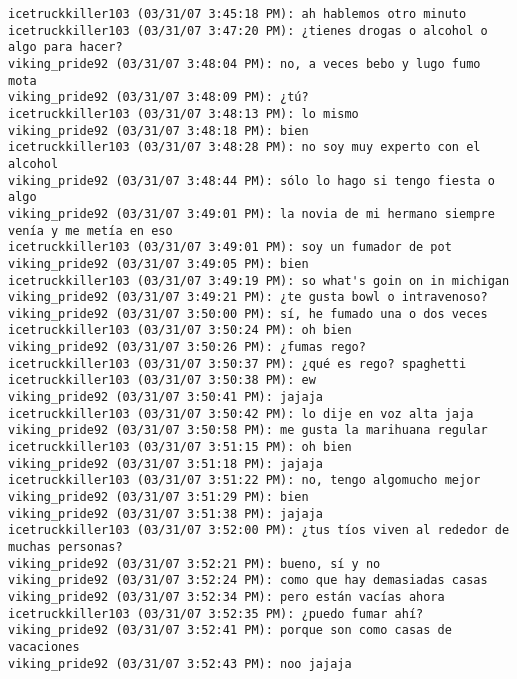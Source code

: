 \begin{verbatim}
icetruckkiller103 (03/31/07 3:45:18 PM): ah hablemos otro minuto
icetruckkiller103 (03/31/07 3:47:20 PM): ¿tienes drogas o alcohol o algo para hacer?
viking_pride92 (03/31/07 3:48:04 PM): no, a veces bebo y lugo fumo mota
viking_pride92 (03/31/07 3:48:09 PM): ¿tú?
icetruckkiller103 (03/31/07 3:48:13 PM): lo mismo
viking_pride92 (03/31/07 3:48:18 PM): bien
icetruckkiller103 (03/31/07 3:48:28 PM): no soy muy experto con el alcohol
viking_pride92 (03/31/07 3:48:44 PM): sólo lo hago si tengo fiesta o algo
viking_pride92 (03/31/07 3:49:01 PM): la novia de mi hermano siempre venía y me metía en eso
icetruckkiller103 (03/31/07 3:49:01 PM): soy un fumador de pot
viking_pride92 (03/31/07 3:49:05 PM): bien
icetruckkiller103 (03/31/07 3:49:19 PM): so what's goin on in michigan
viking_pride92 (03/31/07 3:49:21 PM): ¿te gusta bowl o intravenoso?
viking_pride92 (03/31/07 3:50:00 PM): sí, he fumado una o dos veces
icetruckkiller103 (03/31/07 3:50:24 PM): oh bien
viking_pride92 (03/31/07 3:50:26 PM): ¿fumas rego?
icetruckkiller103 (03/31/07 3:50:37 PM): ¿qué es rego? spaghetti
icetruckkiller103 (03/31/07 3:50:38 PM): ew
viking_pride92 (03/31/07 3:50:41 PM): jajaja
icetruckkiller103 (03/31/07 3:50:42 PM): lo dije en voz alta jaja
viking_pride92 (03/31/07 3:50:58 PM): me gusta la marihuana regular
icetruckkiller103 (03/31/07 3:51:15 PM): oh bien
viking_pride92 (03/31/07 3:51:18 PM): jajaja
icetruckkiller103 (03/31/07 3:51:22 PM): no, tengo algomucho mejor 
viking_pride92 (03/31/07 3:51:29 PM): bien
viking_pride92 (03/31/07 3:51:38 PM): jajaja
icetruckkiller103 (03/31/07 3:52:00 PM): ¿tus tíos viven al rededor de muchas personas?
viking_pride92 (03/31/07 3:52:21 PM): bueno, sí y no
viking_pride92 (03/31/07 3:52:24 PM): como que hay demasiadas casas
viking_pride92 (03/31/07 3:52:34 PM): pero están vacías ahora
icetruckkiller103 (03/31/07 3:52:35 PM): ¿puedo fumar ahí?
viking_pride92 (03/31/07 3:52:41 PM): porque son como casas de vacaciones
viking_pride92 (03/31/07 3:52:43 PM): noo jajaja
\end{verbatim}
